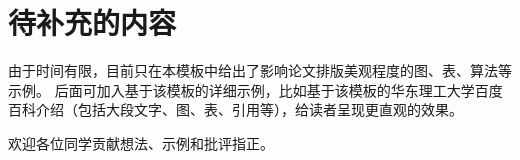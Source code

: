 

\chapter{待补充的内容}\label{c2}
由于时间有限，目前只在本模板中给出了影响论文排版美观程度的图、表、算法等示例。
后面可加入基于该模板的详细示例，比如基于该模板的华东理工大学百度百科介绍（包括大段文字、图、表、引用等），给读者呈现更直观的效果。

欢迎各位同学贡献想法、示例和批评指正。

